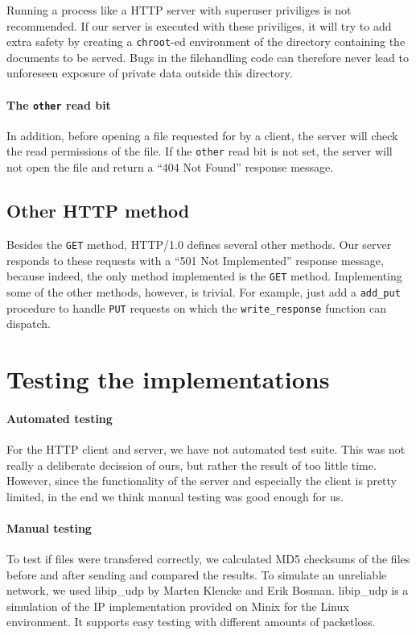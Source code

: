 \documentclass[11pt]{article}
\begin{document}
Running a process like a HTTP server with superuser priviliges is not
recommended. If our server is executed with these priviliges, it will try to
add extra safety by creating a \lstinline|chroot|-ed environment of the
directory containing the documents to be served. Bugs in the filehandling code
can therefore never lead to unforeseen exposure of private data outside this
directory.

\paragraph{The \lstinline|other| read bit}

In addition, before opening a file requested for by a client, the server will
check the read permissions of the file. If the \lstinline|other| read bit is
not set, the server will not open the file and return a ``404 Not Found''
response message.


\subsection{Other HTTP method}

Besides the \lstinline|GET| method, HTTP/1.0 defines several other
methods. Our server responds to these requests with a ``501 Not Implemented''
response message, because indeed, the only method implemented is the
\lstinline|GET| method. Implementing some of the other methods, however, is
trivial. For example, just add a \lstinline|add_put| procedure to handle
\lstinline|PUT| requests on which the \lstinline|write_response| function can
dispatch.


\section{Testing the implementations}

\paragraph{Automated testing}

For the HTTP client and server, we have not automated test suite. This was not
really a deliberate decission of ours, but rather the result of too little
time. However, since the functionality of the server and especially the client
is pretty limited, in the end we think manual testing was good enough for us.

\paragraph{Manual testing}

To test if files were transfered correctly, we calculated MD5 checksums of the
files before and after sending and compared the results. To simulate an
unreliable network, we used libip\_udp by Marten Klencke and Erik
Bosman. libip\_udp is a simulation of the IP implementation provided on Minix
for the Linux environment. It supports easy testing with different amounts of
packetloss.
\end{document}
